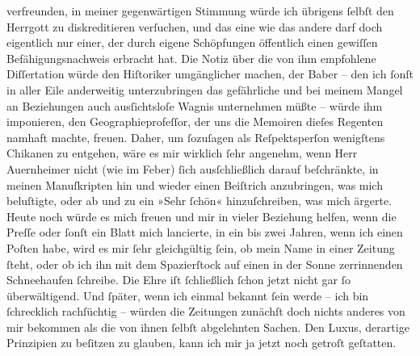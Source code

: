                verfreunden, in meiner gegenwärtigen Stimmung würde ich übrigens ſelbſt den Herrgott
               zu diskreditieren verſuchen, und das eine wie das andere darf doch eigentlich nur
               einer, der durch eigene Schöpfungen öffentlich einen gewiſſen Befähigungsnachweis
               erbracht hat. Die Notiz über die von ihm empfohlene Diſſertation würde den Hiſtoriker umgänglicher machen, der
                  Baber – den ich ſonſt in aller Eile
               anderweitig unterzubringen das gefährliche und bei meinem Mangel an Beziehungen auch
               ausſichtsloſe Wagnis unternehmen müßte – würde ihm imponieren, den Geographieprofeſſor, der uns die Memoiren dieſes Regenten namhaft machte,
               freuen. Daher, um ſozuſagen als Reſpektsperſon wenigſtens Chikanen zu entgehen, wäre
               es mir wirklich ſehr angenehm, wenn Herr Auernheimer nicht (wie im Feber) ſich ausſchließlich darauf
               beſchränkte, in meinen Manuſkripten hin und wieder einen Beiſtrich anzubringen, was
               mich beluſtigte, oder ab und zu ein »Sehr ſchön« hinzuſchreiben, was mich ärgerte.
               Heute noch würde es mich freuen und mir in vieler Beziehung helfen, wenn die Preſſe oder ſonſt ein Blatt mich lancierte, in ein
               bis zwei Jahren, wenn ich einen Poſten habe, wird es mir ſehr gleichgültig ſein, ob
               mein Name in einer Zeitung ſteht, oder ob ich ihn mit dem Spazierſtock auf einen in
               der Sonne zerrinnenden Schneehaufen ſchreibe. {\pb}Die Ehre iſt ſchließlich ſchon jetzt nicht
               gar ſo überwältigend. Und ſpäter, wenn ich einmal bekannt ſein werde – ich bin
               ſchrecklich rachſüchtig – würden die Zeitungen zunächſt doch nichts anderes von mir
               bekommen als die von ihnen ſelbſt abgelehnten Sachen. Den Luxus, derartige Prinzipien
                  \introOben{}zu\introOben{} beſitzen zu glauben, kann ich mir ja jetzt noch
               getroſt geſtatten.\pend
           
